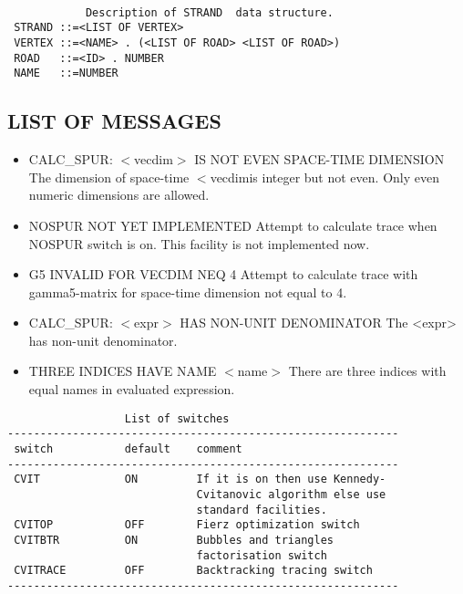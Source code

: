 \begin{verbatim}

            Description of STRAND  data structure.
 STRAND ::=<LIST OF VERTEX>
 VERTEX ::=<NAME> . (<LIST OF ROAD> <LIST OF ROAD>)
 ROAD   ::=<ID> . NUMBER
 NAME   ::=NUMBER
\end{verbatim}


\subsection*{ LIST OF MESSAGES}

\begin{itemize} 

\item{CALC\_SPUR: $<$vecdim$>$ IS NOT EVEN SPACE-TIME DIMENSION}
 The dimension of space-time $<$vecdim$ $is integer but not
even. Only even numeric dimensions are allowed.

\item{NOSPUR NOT YET IMPLEMENTED}
 Attempt to calculate trace when NOSPUR switch is on.  This facility
is not implemented now.

\item{G5 INVALID FOR VECDIM NEQ 4}
 Attempt to calculate trace with gamma5-matrix for space-time
dimension not equal to 4.

\item{CALC\_SPUR: $<$expr$>$ HAS NON-UNIT DENOMINATOR}
The <expr> has non-unit denominator.

\item{THREE INDICES HAVE NAME $<$name$>$}
 There are three indices with equal names in evaluated expression.

\end{itemize}

\begin{verbatim}
                  List of switches
------------------------------------------------------------
 switch           default    comment
------------------------------------------------------------
 CVIT             ON         If it is on then use Kennedy-
                             Cvitanovic algorithm else use
                             standard facilities.
 CVITOP           OFF        Fierz optimization switch
 CVITBTR          ON         Bubbles and triangles
                             factorisation switch
 CVITRACE         OFF        Backtracking tracing switch
------------------------------------------------------------
\end{verbatim}


